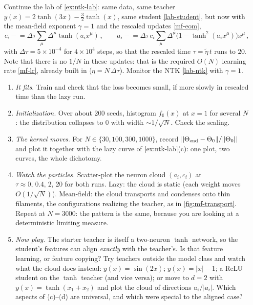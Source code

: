 \documentclass[11pt]{article}
\begin{document}
\begin{exercise}
\label{ex:mf-lab}
\important
Continue the lab of \cref{ex:ntk-lab}: same data, same teacher $y(x) = 2\tanh(3x)-\frac{3}{2}\tanh(x)$, same student \eqref{lab-student}, but now with the mean-field exponent $\gamma = 1$ and the rescaled updates \eqref{mf-eom},
%
\begin{equation}
    c_i \mathrel{-}= \Delta\tau\sum_\mu\Delta^\mu\tanh(a_ix^\mu)\,,\qquad a_i \mathrel{-}= \Delta\tau\,c_i\sum_\mu\Delta^\mu\big(1-\tanh^2(a_ix^\mu)\big)x^\mu\,,
\end{equation}
%
with $\Delta\tau = 5\times10^{-4}$ for $4\times10^4$ steps, so that the rescaled time $\tau = \tilde\eta\, t$ runs to $20$. Note that there is no $1/N$ in these updates: that is the required $O(N)$ learning rate \eqref{mf-lr}, already built in ($\eta = N\,\Delta\tau$). Monitor the NTK \eqref{lab-ntk} with $\gamma=1$.
\begin{enumerate}
    \item \emph{It fits.} Train and check that the loss becomes small, if more slowly in rescaled time than the lazy run.
    \item \emph{Initialization.} Over about $200$ seeds, histogram $f_0(x)$ at $x=1$ for several $N$: the distribution collapses to $0$ with width $\sim1/\sqrt N$. Check the scaling.
    \item \emph{The kernel moves.} For $N\in\{30,100,300,1000\}$, record $\|\Theta_{\rm end}-\Theta_0\|/\|\Theta_0\|$ and plot it together with the lazy curve of \cref{ex:ntk-lab}(c): one plot, two curves, the whole dichotomy.
    \item \emph{Watch the particles.} Scatter-plot the neuron cloud $(a_i,c_i)$ at $\tau\approx0,\,0.4,\,2,\,20$ for both runs. Lazy: the cloud is static (each weight moves $O(1/\sqrt N)$). Mean-field: the cloud transports and condenses onto thin filaments, the configurations realizing the teacher, as in \cref{fig:mf-transport}. Repeat at $N=3000$: the pattern is the same, because you are looking at a deterministic limiting measure.
    \item \emph{Now play.} The starter teacher is itself a two-neuron $\tanh$ network, so the student's features can align \emph{exactly} with the teacher's. Is that feature learning, or feature copying? Try teachers outside the model class and watch what the cloud does instead: $y(x) = \sin(2x)$; $y(x) = |x|-1$; a ReLU student on the $\tanh$ teacher (and vice versa); or move to $d=2$ with $y(x) = \tanh(x_1+x_2)$ and plot the cloud of directions $a_i/|a_i|$. Which aspects of (c)--(d) are universal, and which were special to the aligned case?
\end{enumerate}
\end{exercise}
\end{document}
